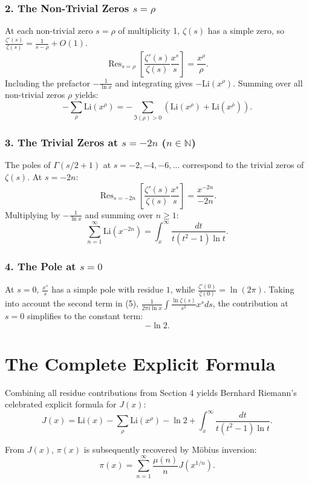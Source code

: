 \documentclass[11pt,a4paper]{article}
\theoremstyle{definition}
\begin{document}
\subsubsection{2. The Non-Trivial Zeros $s = \rho$}
At each non-trivial zero $s = \rho$ of multiplicity 1, $\zeta(s)$ has a simple zero, so $\frac{\zeta'(s)}{\zeta(s)} = \frac{1}{s-\rho} + O(1)$.
\[
\operatorname{Res}_{s=\rho} \left[ \frac{\zeta'(s)}{\zeta(s)} \frac{x^s}{s} \right] = \frac{x^\rho}{\rho}.
\]
Including the prefactor $-\frac{1}{\ln x}$ and integrating gives $-\mathrm{Li}(x^\rho)$. Summing over all non-trivial zeros $\rho$ yields:
\begin{equation}
    -\sum_{\rho} \mathrm{Li}(x^\rho) = -\sum_{\Im(\rho) > 0} \left( \mathrm{Li}(x^\rho) + \mathrm{Li}(x^{\bar{\rho}}) \right).
\end{equation}

\subsubsection{3. The Trivial Zeros at $s = -2n$ ($n \in \mathbb{N}$)}
The poles of $\Gamma(s/2+1)$ at $s = -2, -4, -6, \dots$ correspond to the trivial zeros of $\zeta(s)$. At $s = -2n$:
\[
\operatorname{Res}_{s=-2n} \left[ \frac{\zeta'(s)}{\zeta(s)} \frac{x^s}{s} \right] = \frac{x^{-2n}}{-2n}.
\]
Multiplying by $-\frac{1}{\ln x}$ and summing over $n \ge 1$:
\begin{equation}
    \sum_{n=1}^{\infty} \mathrm{Li}(x^{-2n}) = \int_{x}^{\infty} \frac{dt}{t(t^2 - 1) \ln t}.
\end{equation}

\subsubsection{4. The Pole at $s = 0$}
At $s = 0$, $\frac{x^s}{s}$ has a simple pole with residue $1$, while $\frac{\zeta'(0)}{\zeta(0)} = \ln(2\pi)$. Taking into account the second term in (5), $\frac{1}{2\pi i \ln x} \int \frac{\ln \zeta(s)}{s^2} x^s ds$, the contribution at $s=0$ simplifies to the constant term:
\begin{equation}
    -\ln 2.
\end{equation}

\section{The Complete Explicit Formula}

Combining all residue contributions from Section 4 yields Bernhard Riemann's celebrated explicit formula for $J(x)$:
\begin{equation}
    J(x) = \mathrm{Li}(x) - \sum_{\rho} \mathrm{Li}(x^\rho) - \ln 2 + \int_{x}^{\infty} \frac{dt}{t(t^2 - 1) \ln t}.
\end{equation}

From $J(x)$, $\pi(x)$ is subsequently recovered by Möbius inversion:
\begin{equation}
    \pi(x) = \sum_{n=1}^{\infty} \frac{\mu(n)}{n} J(x^{1/n}).
\end{equation}
\end{document}

